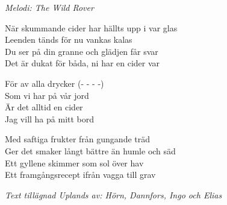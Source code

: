 {\footnotesize\textit{Melodi: The Wild Rover}}\par
\vspace{10pt}
När skummande cider har hällts upp i var glas\\
Leenden tänds för nu vankas kalas\\
Du ser på din granne och glädjen får svar\\
Det är dukat för båda, ni har en cider var\par
\vspace{10pt}
\revrpt För av alla drycker (- - - -)\\
Som vi har på vår jord\\
Är det alltid en cider\\
Jag vill ha på mitt bord\rpt\par
\vspace{10pt}
Med saftiga frukter från gungande träd\\
Ger det smaker långt bättre än humle och säd\\
Ett gyllene skimmer som sol över hav\\
Ett framgångsrecept ifrån vagga till grav\par
\vspace{10pt}
{\footnotesize\textit{Text tillägnad Uplands av: Hörn, Dannfors, Ingo och Elias}}
